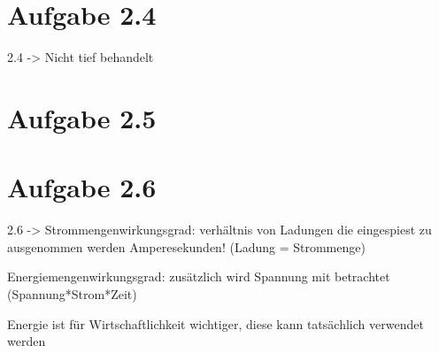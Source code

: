\documentclass[]{article}
\begin{document}
\section*{Aufgabe 2.4}
\par
	2.4 -> Nicht tief behandelt

\section*{Aufgabe 2.5}
\par
\section*{Aufgabe 2.6}
\par
	2.6 -> Strommengenwirkungsgrad: verhältnis von Ladungen die eingespiest zu ausgenommen werden Amperesekunden! (Ladung = Strommenge)

	Energiemengenwirkungsgrad: zusätzlich wird Spannung mit betrachtet (Spannung*Strom*Zeit)

	Energie ist für Wirtschaftlichkeit wichtiger, diese kann tatsächlich verwendet werden
\end{document}
